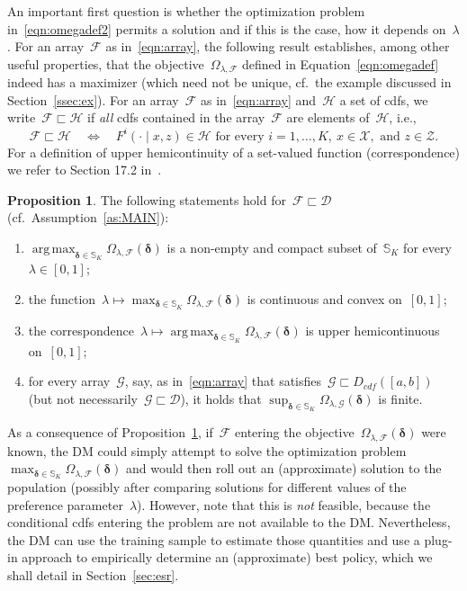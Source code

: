 \documentclass[11pt, a4paper]{article}
\DeclareMathOperator*{\argmax}{arg\,max}
\theoremstyle{definition}
\newtheorem{proposition}[theorem]{Proposition}
\begin{document}
An important first
question is whether the optimization problem in~\eqref{eqn:omegadef2} permits a solution and
if this is the case, how it
depends on~$\lambda$. For an array~$\mathcal{F}$ as in~\eqref{eqn:array}, the following result establishes, among other useful properties, that the objective~$\Omega_{\lambda, \mathcal{F}}$ defined in Equation~\eqref{eqn:omegadef} indeed has a maximizer (which need not be unique, cf.~the example discussed in Section~\ref{ssec:ex}). For an array~$\mathcal{F}$ as in~\eqref{eqn:array} and~$\mathscr{H}$ a set of cdfs, we write~$\mathcal{F} \sqsubset \mathscr{H}$ if \emph{all} cdfs contained in the array~$\mathcal{F}$ are elements of~$\mathscr{H}$, i.e., 
\begin{equation*}
\mathcal{F} \sqsubset \mathscr{H} \quad \Leftrightarrow \quad  F^i(\cdot \mid x, z) \in \mathscr{H} \text{ for every } i = 1, \hdots, K,~x \in \mathcal{X}, \text{ and } z \in \mathcal{Z}.
\end{equation*} For a definition of upper hemicontinuity of a set-valued function (correspondence) we refer to Section 17.2 in~\cite{hhg}.
%
\begin{proposition}\label{prop:exmax}
The following statements hold for~$\mathcal{F} \sqsubset \mathscr{D}$ (cf.~Assumption~\ref{as:MAIN}):
\begin{enumerate}
\item $\argmax_{\bm{\delta} \in \mathbb{S}_K}\Omega_{\lambda, \mathcal{F}}(\bm{\delta})$ is a non-empty and compact subset of~$\mathbb{S}_K$ for every~$\lambda \in [0, 1]$;
\item the function~$\lambda \mapsto \max_{\bm{\delta} \in \mathbb{S}_K}\Omega_{\lambda, \mathcal{F}}(\bm{\delta})$ is continuous and convex on~$[0, 1]$;
\item the correspondence~$\lambda \mapsto \argmax_{\bm{\delta} \in \mathbb{S}_K}\Omega_{\lambda, \mathcal{F}}(\bm{\delta})$ is upper hemicontinuous on~$[0, 1]$;
\item for every array~$\mathcal{G}$, say, as in~\eqref{eqn:array} that satisfies~$\mathcal{G} \sqsubset D_{cdf}([a,b])$ (but not necessarily~$\mathcal{G} \sqsubset \mathscr{D}$), it holds that $\sup_{\bm{\delta} \in \mathbb{S}_K}	\Omega_{\lambda, \mathcal{G}}(\bm{\delta})$ is finite.
\end{enumerate} 
\end{proposition}
%
As a consequence of Proposition~\ref{prop:exmax}, if~$\mathcal{F}$ entering the objective~$\Omega_{\lambda, \mathcal{F}}(\bm{\delta})$ were known, the DM could simply attempt to solve the optimization problem~$\max_{\bm{\delta} \in \mathbb{S}_K}\Omega_{\lambda, \mathcal{F}}(\bm{\delta})$ and would then roll out an (approximate) solution to the population (possibly after comparing solutions for different values of the preference parameter~$\lambda$). However, note that this is \emph{not} feasible, because the conditional cdfs entering the problem are not available to the DM. Nevertheless, the DM can use the training sample to estimate those quantities and use a plug-in approach to empirically determine an (approximate) best policy, which we shall detail in Section~\ref{sec:esr}.
\end{document}
